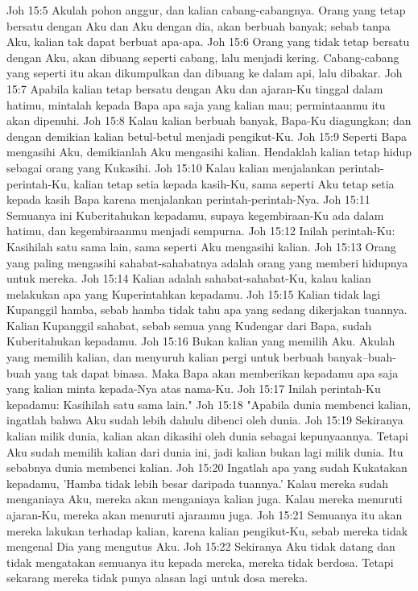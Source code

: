 Joh 15:5  Akulah pohon anggur, dan kalian cabang-cabangnya. Orang yang tetap bersatu dengan Aku dan Aku dengan dia, akan berbuah banyak; sebab tanpa Aku, kalian tak dapat berbuat apa-apa.
Joh 15:6  Orang yang tidak tetap bersatu dengan Aku, akan dibuang seperti cabang, lalu menjadi kering. Cabang-cabang yang seperti itu akan dikumpulkan dan dibuang ke dalam api, lalu dibakar.
Joh 15:7  Apabila kalian tetap bersatu dengan Aku dan ajaran-Ku tinggal dalam hatimu, mintalah kepada Bapa apa saja yang kalian mau; permintaanmu itu akan dipenuhi.
Joh 15:8  Kalau kalian berbuah banyak, Bapa-Ku diagungkan; dan dengan demikian kalian betul-betul menjadi pengikut-Ku.
Joh 15:9  Seperti Bapa mengasihi Aku, demikianlah Aku mengasihi kalian. Hendaklah kalian tetap hidup sebagai orang yang Kukasihi.
Joh 15:10  Kalau kalian menjalankan perintah-perintah-Ku, kalian tetap setia kepada kasih-Ku, sama seperti Aku tetap setia kepada kasih Bapa karena menjalankan perintah-perintah-Nya.
Joh 15:11  Semuanya ini Kuberitahukan kepadamu, supaya kegembiraan-Ku ada dalam hatimu, dan kegembiraanmu menjadi sempurna.
Joh 15:12  Inilah perintah-Ku: Kasihilah satu sama lain, sama seperti Aku mengasihi kalian.
Joh 15:13  Orang yang paling mengasihi sahabat-sahabatnya adalah orang yang memberi hidupnya untuk mereka.
Joh 15:14  Kalian adalah sahabat-sahabat-Ku, kalau kalian melakukan apa yang Kuperintahkan kepadamu.
Joh 15:15  Kalian tidak lagi Kupanggil hamba, sebab hamba tidak tahu apa yang sedang dikerjakan tuannya. Kalian Kupanggil sahabat, sebab semua yang Kudengar dari Bapa, sudah Kuberitahukan kepadamu.
Joh 15:16  Bukan kalian yang memilih Aku. Akulah yang memilih kalian, dan menyuruh kalian pergi untuk berbuah banyak--buah-buah yang tak dapat binasa. Maka Bapa akan memberikan kepadamu apa saja yang kalian minta kepada-Nya atas nama-Ku.
Joh 15:17  Inilah perintah-Ku kepadamu: Kasihilah satu sama lain."
Joh 15:18  "Apabila dunia membenci kalian, ingatlah bahwa Aku sudah lebih dahulu dibenci oleh dunia.
Joh 15:19  Sekiranya kalian milik dunia, kalian akan dikasihi oleh dunia sebagai kepunyaannya. Tetapi Aku sudah memilih kalian dari dunia ini, jadi kalian bukan lagi milik dunia. Itu sebabnya dunia membenci kalian.
Joh 15:20  Ingatlah apa yang sudah Kukatakan kepadamu, 'Hamba tidak lebih besar daripada tuannya.' Kalau mereka sudah menganiaya Aku, mereka akan menganiaya kalian juga. Kalau mereka menuruti ajaran-Ku, mereka akan menuruti ajaranmu juga.
Joh 15:21  Semuanya itu akan mereka lakukan terhadap kalian, karena kalian pengikut-Ku, sebab mereka tidak mengenal Dia yang mengutus Aku.
Joh 15:22  Sekiranya Aku tidak datang dan tidak mengatakan semuanya itu kepada mereka, mereka tidak berdosa. Tetapi sekarang mereka tidak punya alasan lagi untuk dosa mereka.
